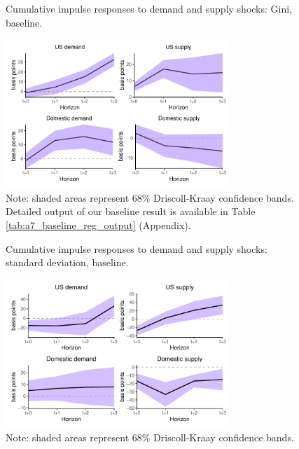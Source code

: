 \documentclass[12pt, a4paper]{article}
\begin{document}
\begin{figure}[H]
    \centering    
    \caption{Cumulative impulse responses to demand and supply shocks: Gini, baseline.}  
    \label{fig:demand_supply_base}
    \includegraphics[width=0.75\textwidth]{Figures/baseline_demand_supply_LP_extended.pdf}
    \centering \caption*{Note: shaded areas represent 68\% Driscoll-Kraay confidence bands. Detailed output of our baseline result is available in Table \ref{tab:a7_baseline_reg_output} (Appendix).}
\end{figure}

\begin{figure}[H]
    \centering    
    \caption{Cumulative impulse responses to demand and supply shocks: standard deviation, baseline.}  
    \label{fig:std_base}
    \includegraphics[width=0.75\textwidth]{Figures/std_demand_supply_LP.pdf}
    \centering \caption*{Note: shaded areas represent 68\% Driscoll-Kraay confidence bands.}
\end{figure}
\end{document}
